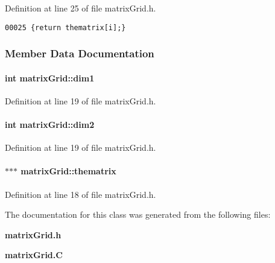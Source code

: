Definition at line 25 of file matrix\-Grid.h.\small\begin{verbatim}00025 {return thematrix[i];}
\end{verbatim}\normalsize 


\subsubsection{Member Data Documentation}
\label{matrixGrid_o1}
\paragraph{\setlength{\rightskip}{0pt plus 5cm}int matrix\-Grid::dim1\hspace{0.3cm}{\tt  [private]}}\hfill



Definition at line 19 of file matrix\-Grid.h.\label{matrixGrid_o2}
\paragraph{\setlength{\rightskip}{0pt plus 5cm}int matrix\-Grid::dim2\hspace{0.3cm}{\tt  [private]}}\hfill



Definition at line 19 of file matrix\-Grid.h.\label{matrixGrid_o0}
\paragraph{ $\ast$$\ast$$\ast$ matrix\-Grid::thematrix\hspace{0.3cm}{\tt  [private]}}\hfill



Definition at line 18 of file matrix\-Grid.h.

The documentation for this class was generated from the following files:\begin{CompactItemize}
\item 
{\bf matrix\-Grid.h}\item 
{\bf matrix\-Grid.C}\end{CompactItemize}
